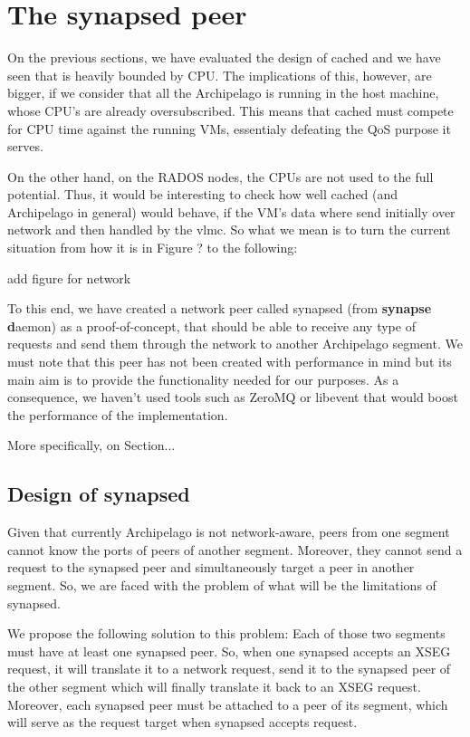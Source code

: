 \chapter{The synapsed peer}

On the previous sections, we have evaluated the design of cached and we have 
seen that is heavily bounded by CPU. The implications of this, however,
are bigger, if we consider that all the Archipelago is running in the host 
machine, whose CPU's are already oversubscribed. This means that cached must 
compete for CPU time against the running VMs, essentialy defeating the QoS 
purpose it serves.

On the other hand, on the RADOS nodes, the CPUs are not used to the full 
potential. Thus, it would be interesting to check how well cached (and 
Archipelago in general) would behave, if the VM's data where send initially 
over network and then handled by the vlmc. So what we mean is to turn the 
current situation from how it is in Figure ? to the following:

\fixme add figure for network

To this end, we have created a network peer called synapsed (from 
\textbf{synapse d}aemon) as a proof-of-concept, that should be able to receive 
any type of requests and send them through the network to another Archipelago 
segment. We must note that this peer has not been created with performance in 
mind but its main aim is to provide the functionality needed for our purposes.  
As a consequence, we haven't used tools such as ZeroMQ or libevent that would 
boost the performance of the implementation.

More specifically, on Section...

\section{Design of synapsed}

Given that currently Archipelago is not network-aware, peers from one segment 
cannot know the ports of peers of another segment. Moreover, they cannot send a 
request to the synapsed peer and simultaneously target a peer in another 
segment. So, we are faced with the problem of what will be the limitations of 
synapsed.

We propose the following solution to this problem: Each of those two segments 
must have at least one synapsed peer. So, when one synapsed accepts an XSEG 
request, it will translate it to a network request, send it to the synapsed 
peer of the other segment which will finally translate it back to an XSEG 
request.  Moreover, each synapsed peer must be attached to a peer of its 
segment, which will serve as the request target when synapsed accepts request.  

